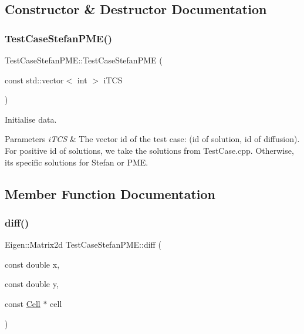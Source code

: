 \subsection{Constructor \& Destructor Documentation}
\mbox{\label{classTestCaseStefanPME_a5e456675c254048c7a087d4d2f1466c8}} 
\subsubsection{\texorpdfstring{Test\+Case\+Stefan\+P\+M\+E()}{TestCaseStefanPME()}}
{\footnotesize\ttfamily Test\+Case\+Stefan\+P\+M\+E\+::\+Test\+Case\+Stefan\+P\+ME (\begin{DoxyParamCaption}\item[{const std\+::vector$<$ int $>$}]{i\+T\+CS }\end{DoxyParamCaption})}



Initialise data. 


\begin{DoxyParams}{Parameters}
{\em i\+T\+CS} & The vector id of the test case\+: (id of solution, id of diffusion). For positive id of solutions, we take the solutions from Test\+Case.\+cpp. Otherwise, it\textquotesingle{}s specific solutions for Stefan or P\+ME. \\
\hline
\end{DoxyParams}


\subsection{Member Function Documentation}
\mbox{\label{classTestCaseStefanPME_ae99d679c24d05b295bcd01538c175a6d}} 
\subsubsection{\texorpdfstring{diff()}{diff()}}
{\footnotesize\ttfamily Eigen\+::\+Matrix2d Test\+Case\+Stefan\+P\+M\+E\+::diff (\begin{DoxyParamCaption}\item[{const double}]{x,  }\item[{const double}]{y,  }\item[{const \hyperlink{classHArDCore2D_1_1Cell}{Cell} $\ast$}]{cell }\end{DoxyParamCaption})}



